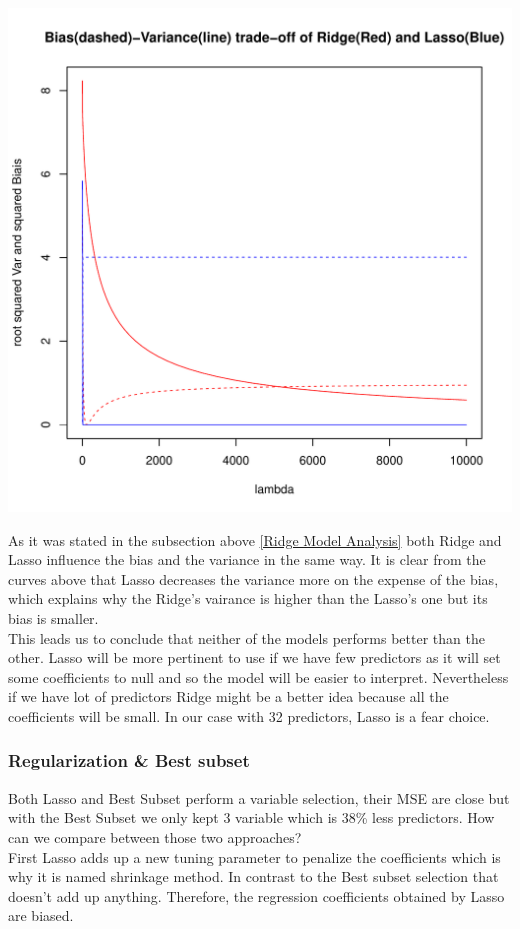 \documentclass[]{report}
\begin{document}
\begin{center}
	\includegraphics[width=0.8\linewidth]{Figures/var_biais_ridge_lasso.pdf}
\end{center}
As it was stated in the subsection above \ref{Ridge Model Analysis} both Ridge and Lasso influence the bias and the variance in the same way.
It is clear from the curves above that Lasso decreases the variance more on the expense of the bias, which explains why the Ridge's vairance is higher than the Lasso's one but its bias is smaller. \\
This leads us to conclude that neither of the models performs better than the other. Lasso will be more pertinent to use if we have few predictors as it will set some coefficients to null and so the model will be easier to interpret. Nevertheless if we have lot of predictors Ridge might be a better idea because all the coefficients will be small. In our case with 32 predictors, Lasso is a fear choice.

\subsubsection{Regularization \& Best subset}
Both Lasso and Best Subset perform a variable selection, their MSE are close but with the Best Subset we only kept 3 variable which is 38\% less predictors. How can we compare between those two approaches?\\
First Lasso adds up a new tuning parameter to penalize the coefficients which is why it is named shrinkage method. In contrast to the Best subset selection that doesn't add up anything. Therefore, the regression coefficients obtained by Lasso are biased.
\end{document}
